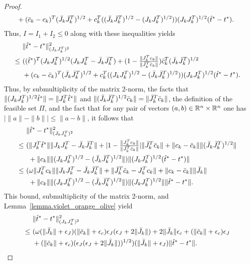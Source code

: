 \begin{proof}
\begin{align*}
    &\ + ({\bar c}_k - c_k)^T ({\bar J}_k {\bar J}_k^T)^{1/2} + c_k^T ( ({\bar J}_k {\bar J}_k^T)^{1/2} - (J_k J_k^T)^{1/2} ) ) (J_k J_k^T)^{1/2} ({\hat t}^* - t^*).
  \end{align*}
  Thus, $I = I_1 + I_2 \leq 0$ along with these inequalities yields
  \begin{align*}
    &\ \| {\hat t}^* - t^* \|_{(J_k J_k^T)^2}^2 \\
    \leq&\ ( ({\hat t}^*)^T (J_k J_k^T)^{1/2} ( J_k J_k^T - {\bar J}_k {\bar J}_k^T ) + (1 - {\tfrac{\|J_k^Tc_k\|}{\|{\bar J}_k^T{\bar c}_k\|}} ) {\bar c}_k^T ({\bar J}_k {\bar J}_k^T)^{1/2}  \\
        &\ + (c_k - {\bar c}_k)^T ({\bar J}_k {\bar J}_k^T)^{1/2} + c_k^T ((J_k J_k^T)^{1/2} - ({\bar J}_k {\bar J}_k^T)^{1/2}) ) (J_k J_k^T)^{1/2} ({\hat t}^* - t^*).  
  \end{align*}
  Thus, by submultiplicity of the matrix 2-norm, the facts that $\|(J_k J_k^T)^{1/2} {\hat t}^*\| = \|J_k^T {\hat t}^*\|$ and $\|({\bar J}_k {\bar J}_k^T)^{1/2} {\bar c}_k\| = \|{\bar J}_k^T {\bar c}_k\|$, the definition of the feasible set $\Pi$, and the fact that for any pair of vectors $(a, b) \in \mathbb{R}^n \times \mathbb{R}^n$ one has $| \|a\| - \|b\| | \leq \|a - b\|$, it follows that
  \begin{align*}
    &\ \|{\hat t}^* - t^*\|_{(J_k J_k^T)^2}^2 \nonumber \\
    \leq&\ ( \|J_k^T {\hat t}^*\| \| J_k J_k^T - {\bar J}_k {\bar J}_k^T \| + |1 - {\tfrac{\|J_k^Tc_k\|}{\|{\bar J}_k^T{\bar c}_k\|}}| \|{\bar J}_k^T {\bar c}_k\| + \|c_k - {\bar c}_k \| \|({\bar J}_k {\bar J}_k^T)^{1/2}\| \nonumber \\
     & \ \ + \|c_k\| \|(J_k J_k^T)^{1/2} - ({\bar J}_k {\bar J}_k^T)^{1/2} \| ) \|(J_k J_k^T)^{1/2} ({\hat t}^* - t^*) \| \nonumber \\
    \leq&\ (\omega \| J_k^T c_k \| \| J_k J_k^T - {\bar J}_k {\bar J}_k^T \| + \| {\bar J}_k^T {\bar c}_k - J_k^T c_k \| + \|c_k - {\bar c}_k \| \|{\bar J}_k\| \nonumber \\
  & \ \ +  \|c_k\| \|(J_k J_k^T)^{1/2} - ({\bar J}_k {\bar J}_k^T)^{1/2} \| ) \|(J_k J_k^T)^{1/2} \| \| {\hat t}^* - t^* \|.
  \end{align*}
  This bound, submultiplicity of the matrix 2-norm, and Lemma~\ref{lemma.violet_orange_olive} yield
  \begin{align*}
    &\ \| \that^* - t^* \|_{(J_k J_k^T)^2}^2 \\
    \leq&\ (\omega (\|\Jtrue_k\| + \eps_J) (\|\ctrue_k \| + \eps_c) \eps_J (\eps_J + 2 \|\Jtrue_k\| ) + 2 \|\Jtrue_k\| \eps_c + (\|\ctrue_k\| + \eps_c) \eps_J\\
    &\ + (\|\ctrue_k\| + \eps_c) (\eps_J ( \eps_J + 2 \|\Jtrue_k\| ))^{1/2} ) (\|\Jtrue_k\| + \eps_J) \| \that^* - t^* \|. 

\end{align*}
\end{proof}
